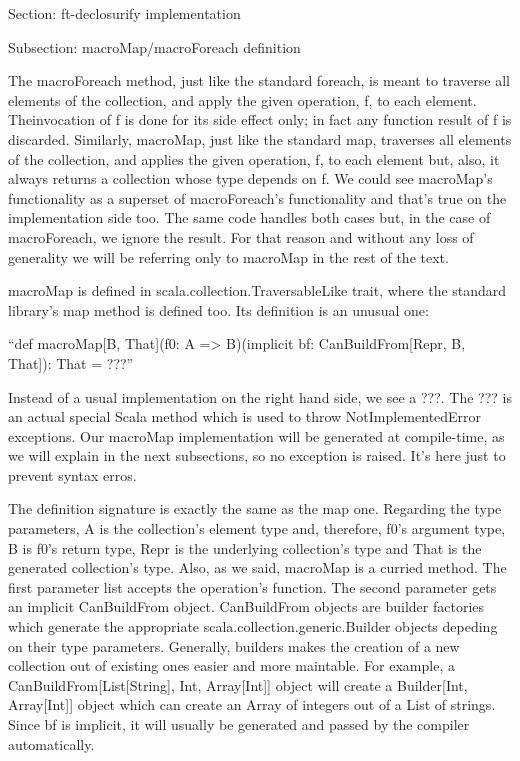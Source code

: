 Section: ft-declosurify implementation

Subsection: macroMap/macroForeach definition

The macroForeach method, just like the standard foreach, is meant to traverse
all elements of the collection, and apply the given operation, f, to each
element. Theinvocation of f is done for its side effect only; in fact any
function result of f is discarded. Similarly, macroMap, just like the standard
map, traverses all elements of the collection, and applies the given operation,
f, to each element but, also, it always returns a collection whose type depends
on f. We could see macroMap's functionality as a superset of macroForeach's
functionality and that's true on the implementation side too. The same code
handles both cases but, in the case of macroForeach, we ignore the result. For
that reason and without any loss of generality we will be referring only to
macroMap in the rest of the text.

macroMap is defined in scala.collection.TraversableLike trait, where the
standard library's map method is defined too. Its definition is an unusual one:

``def macroMap[B, That](f0: A => B)(implicit bf: CanBuildFrom[Repr, B, That]):
That = ???''

Instead of a usual implementation on the right hand side, we see a ???. The ???
is an actual special Scala method which is used to throw NotImplementedError
exceptions. Our macroMap implementation will be generated at compile-time, as
we will explain in the next subsections, so no exception is raised. It's here
just to prevent syntax erros. 

The definition signature is exactly the same as the map one. Regarding the
type parameters, A is the collection's element type and, therefore, f0's
argument type, B is f0's return type, Repr is the underlying collection's type
and That is the generated collection's type. Also, as we said, macroMap is a
curried method. The first parameter list accepts the operation's function. The
second parameter gets an implicit CanBuildFrom object. CanBuildFrom objects are
builder factories which generate the appropriate
scala.collection.generic.Builder objects depeding on their type parameters.
Generally, builders makes the creation of a new collection out of existing ones
easier and more maintable. For example, a CanBuildFrom[List[String], Int,
Array[Int]] object will create a Builder[Int, Array[Int]] object which can
create an Array of integers out of a List of strings. Since bf is implicit, it
will usually be generated and passed by the compiler automatically.


